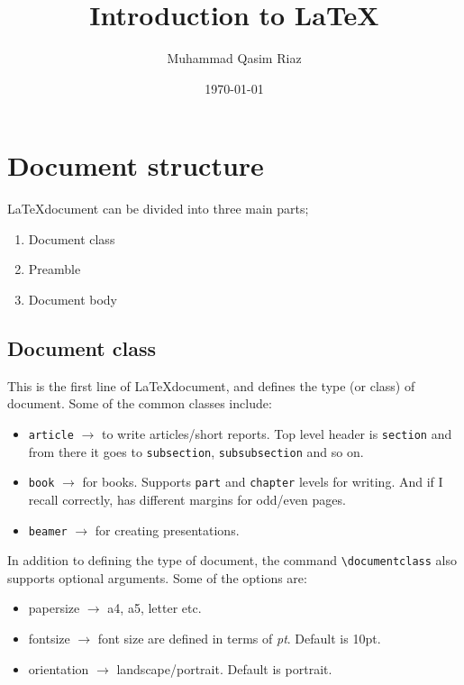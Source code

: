 \documentclass[a4paper, 11pt]{article}
\author{Muhammad Qasim Riaz}
\title{Introduction to \LaTeX{}}
\date{\today}
\begin{document}
	
\maketitle %

\tableofcontents

\newpage
	
\section{Document structure}\label{sec:Document-structure}
	
	\LaTeX document can be divided into three main parts;

	\begin{enumerate}
		\item Document class
		\item Preamble
		\item Document body
	\end{enumerate}
	
	\subsection{Document class}\label{sec:Document-class}
	
	This is the first line of \LaTeX document, and defines the type (or class) of document. Some of the common classes include:
	
	\begin{itemize}
		\item \texttt{article} $\rightarrow$ to write articles/short reports. Top level header is \lstinline|section| and from there it goes to \lstinline|subsection|, \lstinline|subsubsection| and so on.
		\item \texttt{book} $\rightarrow$ for books. Supports \lstinline|part| and \lstinline|chapter| levels for writing. And if I recall correctly, has different margins for odd/even pages.
		\item \texttt{beamer} $\rightarrow$ for creating presentations.
	\end{itemize}

	In addition to defining the type of document, the command \lstinline|\documentclass| also supports optional arguments. Some of the options are:
	
	\begin{itemize}
		\item papersize $\rightarrow$ a4, a5, letter etc.
		\item fontsize $\rightarrow$ font size are defined in terms of \emph{pt}. Default is 10pt.
		\item orientation $\rightarrow$ landscape/portrait. Default is portrait.
	\end{itemize}
	
\end{document}
